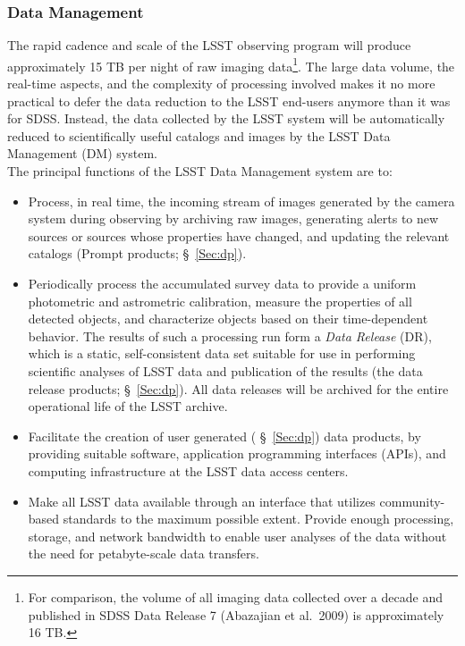 \vskip 0.2in
\subsubsection{ Data Management }
\label{sec:dm}

The rapid cadence and scale of the LSST observing program will produce
approximately 15 TB per night of raw imaging data\footnote{For
  comparison, the volume of all imaging data collected over a decade
  and published in SDSS Data Release 7 (Abazajian et al.~2009) is approximately 16 TB.}. The large data volume, the real-time aspects, and the complexity of processing involved makes it no more practical to defer the data reduction to the LSST end-users anymore than it was for SDSS. Instead, the data collected by the LSST system will be automatically reduced to scientifically useful catalogs and images by the LSST Data Management (DM) system.
\\

The principal functions of the LSST Data Management system are to:
\begin{itemize}
\item Process, in real time, the incoming stream of images generated by the camera system during observing by archiving raw images, generating alerts to new sources or sources whose properties have changed, and updating the relevant catalogs (Prompt  products; \S~\ref{Sec:dp}).
\item Periodically process the accumulated survey data to provide a
  uniform photometric and astrometric calibration, measure the
  properties of all detected objects, and characterize objects based on their time-dependent behavior. The results of such a processing run form a {\em Data Release} (DR), which is a static, self-consistent data set suitable for use in performing scientific analyses of LSST data and publication of the results (the data release products; \S~\ref{Sec:dp}). All data releases will be archived for the entire operational life of the LSST archive.
\item Facilitate the creation of user generated (
  \S~\ref{Sec:dp}) data products, by providing suitable software,
  application programming interfaces (APIs),
and computing infrastructure at the LSST data access centers.
\item Make all LSST data available through an interface that utilizes
community-based standards   to the maximum possible extent. Provide
  enough processing, storage, and network bandwidth to enable user
  analyses of the data without the need for petabyte-scale data
  transfers.
\end{itemize}


